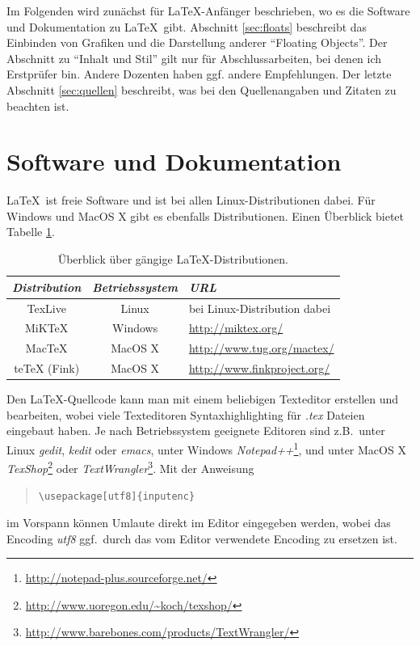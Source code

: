 \documentclass[12pt]{article}
\begin{document}
Im Folgenden wird zunächst für \LaTeX-Anfänger beschrieben, wo es die
Software und Dokumentation zu \LaTeX\ gibt. Abschnitt \ref{sec:floats}
beschreibt das Einbinden von Grafiken und die Darstellung anderer ``Floating
Objects''. Der Abschnitt zu ``Inhalt und Stil'' gilt nur für Abschlussarbeiten,
bei denen ich Erstprüfer bin. Andere Dozenten haben ggf. andere Empfehlungen.
Der letzte Abschnitt \ref{sec:quellen} beschreibt, was bei den
Quellenangaben und Zitaten zu beachten ist.


\section{Software und Dokumentation}
\LaTeX\ ist freie Software und ist bei allen Linux-Distributionen dabei.
Für Windows und MacOS X gibt es ebenfalls Distributionen. Einen Überblick
bietet Tabelle \ref{tbl:latexdists}.
\begin{table}[t]
\centering
\begin{tabular}{c|c|l}
{\em Distribution} & {\em Betriebssystem} & {\em URL} \\ \hline\hline
TexLive & Linux & bei Linux-Distribution dabei \\ \hline
MiKTeX & Windows &  \url{http://miktex.org/}\\ \hline
MacTeX & MacOS X & \url{http://www.tug.org/mactex/} \\ \hline
teTeX (Fink) & MacOS X & \url{http://www.finkproject.org/}
\end{tabular}
\caption{\label{tbl:latexdists} Überblick über gängige \LaTeX-Distributionen.
}
\end{table}

Den \LaTeX-Quellcode kann man mit einem beliebigen Texteditor erstellen und
bearbeiten, wobei viele Texteditoren Syntaxhighlighting für {\em *.tex} Dateien
eingebaut haben. Je nach Betriebssystem geeignete Editoren sind 
z.B.~unter Linux {\em gedit}, {\em kedit} oder {\em emacs},
unter Windows 
{\em Notepad++}\footnote{\url{http://notepad-plus.sourceforge.net/}}, und unter
MacOS X {\em TexShop}\footnote{\url{http://www.uoregon.edu/~koch/texshop/}}
oder {\em TextWrangler}\footnote{\url{http://www.barebones.com/products/TextWrangler/}}.
Mit der Anweisung
\begin{quote}
\verb+\usepackage[utf8]{inputenc}+
\end{quote}
im Vorspann können Umlaute direkt im Editor eingegeben werden, wobei das
Encoding {\em utf8} ggf.~durch das vom Editor verwendete Encoding
zu ersetzen ist.
\end{document}
